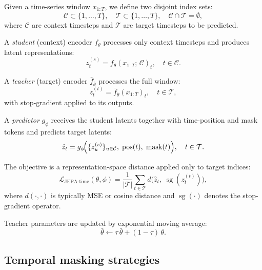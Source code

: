 \documentclass[11pt,a4paper]{article}
\newcommand{\sg}{\operatorname{sg}}        %
\newcommand{\pos}{\operatorname{pos}}      %
\newcommand{\mask}{\operatorname{mask}}    %
\begin{document}
Given a time-series window $x_{1:T}$, we define two disjoint index sets:
\begin{equation}\label{eq:index-sets}
\mathcal{C} \subset \{1,\dots,T\}, \quad
\mathcal{T} \subset \{1,\dots,T\}, \quad
\mathcal{C}\cap\mathcal{T}=\emptyset,
\end{equation}
where $\mathcal{C}$ are context timesteps and $\mathcal{T}$ are target
timesteps to be predicted.

A \emph{student} (context) encoder $f_\theta$ processes only context timesteps
and produces latent representations:
\begin{equation}\label{eq:student}
z_t^{(s)} = f_\theta(x_{1:T};\,\mathcal{C})_t, \quad t\in\mathcal{C}.
\end{equation}

A \emph{teacher} (target) encoder $\bar{f}_{\bar{\theta}}$ processes the full
window:
\begin{equation}\label{eq:teacher}
z_t^{(t)} = \bar{f}_{\bar{\theta}}(x_{1:T})_t, \quad t\in\mathcal{T},
\end{equation}
with stop-gradient applied to its outputs.

A \emph{predictor} $g_\phi$ receives the student latents together with
time-position and mask tokens and predicts target latents:
\begin{equation}\label{eq:predictor}
\hat{z}_t = g_\phi\!\Bigl(\{z_u^{(s)}\}_{u\in\mathcal{C}},\;
  \pos(t),\;\mask(t)\Bigr), \quad t\in\mathcal{T}.
\end{equation}

The objective is a representation-space distance applied only to target
indices:
\begin{equation}\label{eq:loss}
\mathcal{L}_{\text{JEPA-time}}(\theta,\phi) =
\frac{1}{|\mathcal{T}|}
\sum_{t\in\mathcal{T}}
d\!\bigl(\hat{z}_t,\;\sg(z_t^{(t)})\bigr),
\end{equation}
where $d(\cdot,\cdot)$ is typically MSE or cosine distance and
$\sg(\cdot)$ denotes the stop-gradient operator.

Teacher parameters are updated by exponential moving average:
\begin{equation}\label{eq:ema}
\bar{\theta} \leftarrow \tau\,\bar{\theta} + (1-\tau)\,\theta.
\end{equation}

\subsection{Temporal masking strategies}
\end{document}
